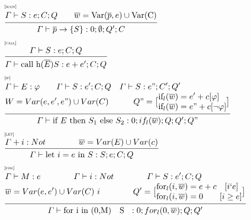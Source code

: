 \documentclass[../../main.tex]{subfiles}
\begin{document}
\begin{align}
    &\mathrule{main}{
        \begin{aligned} \varGamma \vdash S : e ; C; Q  \quad \quad
        \overline{w} = \text{Var}(\overline{p},e) \cup \text{Var(C)}
        \end{aligned}
        }{\varGamma \vdash \overline{p}  \rightarrow \{S\}: 0 ;\emptyset;Q';C} \\
    &\mathrule{call}{\varGamma \vdash S : e ; C; Q}{\varGamma \vdash \text{call h}(\overline{E}) S : e + e' ; C; Q}\\
    &\mathrule{if}{
    \begin{aligned}
        &\varGamma \vdash E : \varphi  \quad \quad \varGamma \vdash S : e'; C; Q \quad \varGamma \vdash S : e"; C'; Q'\\
        &W = Var(e, e', e") \cup Var(C) \quad \quad \quad Q" =\big[ \begin{aligned}
            &\text{if}_l(\overline{w})  = e'+c[\varphi]\\
            &\text{if}_l(\overline{w})  = e"+c[\neg \varphi]\\
        \end{aligned}\big] \\
    \end{aligned}    
    }{\varGamma \vdash \text{if } E \text{ then } S_1 \text{ else } S_2 : 0; if_l(\overline{w}); Q; Q'; Q"}\\
    &\mathrule{let}{\varGamma + i : Not \quad \quad \quad \quad \overline{w} = Var(E) \cup Var(c)}{\varGamma \vdash \text{let } i = e \text{ in } S : S;e ; C; Q}\\
    &\mathrule{for}{
        \begin{aligned}
            &\varGamma \vdash M: e \quad \quad \quad \quad \varGamma \vdash i : Not\quad \quad \quad \quad \varGamma \vdash S : e'; C; Q\\
            &\overline{w} = Var(e, e') \cup Var(C) \ i \quad \quad \quad \quad Q' = \big[ \begin{aligned}
                &\text{for}_l(i,\overline{w}) = e + c\quad [i \lq e]\\
                &\text{for}_l(i,\overline{w}) = 0 \quad \quad [i \geq e]\\
            \end{aligned}\big]
        \end{aligned}
    }{\varGamma \vdash \text{for i in (0,M) } \text{ { S } } : 0; for_l(0,\overline{w}); Q; Q'}
\end{align}
\end{document}
